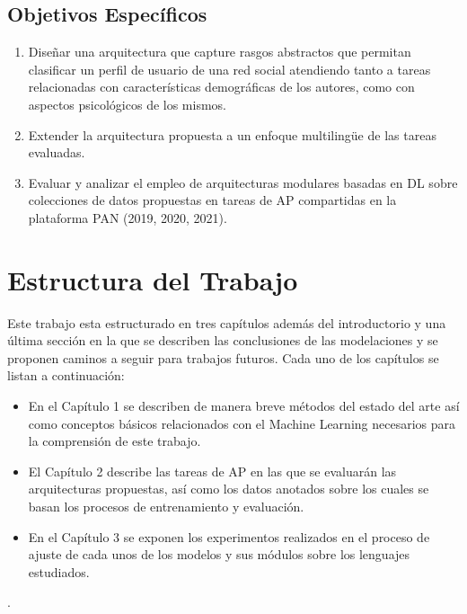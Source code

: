 \subsection*{Objetivos Específicos}
\begin{enumerate}
	\item Diseñar una arquitectura que capture rasgos abstractos que permitan clasificar un perfil de usuario de una red social atendiendo tanto a tareas relacionadas con características demográficas de los autores, como con aspectos psicológicos de los mismos.
	\item Extender la arquitectura propuesta a un enfoque multilingüe de las tareas evaluadas.
	\item Evaluar y analizar el empleo de arquitecturas modulares basadas en DL sobre colecciones de datos propuestas en tareas de AP compartidas en la plataforma PAN (2019, 2020, 2021).
\end{enumerate}
\section*{Estructura del Trabajo}
Este trabajo esta estructurado en tres capítulos además del introductorio y una última sección en la que se describen las conclusiones de las modelaciones y se proponen  caminos a seguir para trabajos futuros. Cada uno de los capítulos se listan a continuación: 

\begin{itemize}
	\item En el Capítulo 1 se describen de manera breve métodos del estado del arte así como conceptos básicos relacionados con el Machine Learning necesarios para la comprensión de este trabajo.
	\item El Capítulo 2 describe las tareas de AP en las que se evaluarán las arquitecturas propuestas, así como los datos anotados sobre los cuales se basan los procesos de entrenamiento y evaluación.
	\item En el Capítulo 3 se exponen los experimentos realizados en el proceso de ajuste de cada unos de los modelos y sus módulos sobre los lenguajes estudiados. 
\end{itemize}
. 